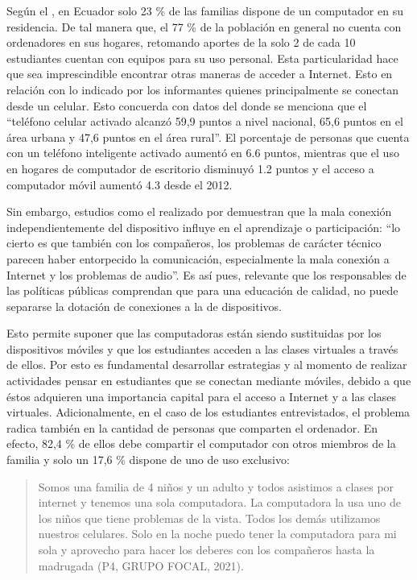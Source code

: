 \documentclass{textolivre}
\begin{document}
Según el \textcite{instituto_nacional_de_estadisticas_y_censos_de_ecuador_[inec]_encuesta_2020}, en Ecuador solo 23 \% de las familias dispone de un computador en su residencia. De tal manera que, el 77 \% de la población en general no cuenta con ordenadores en sus hogares, retomando aportes de la \textcite{organizacion_de_las_naciones_unidas_[onu]_priorizar_2021} solo 2 de cada 10 estudiantes cuentan con equipos para su uso personal. Esta particularidad hace que sea imprescindible encontrar otras maneras de acceder a Internet. 
Esto en relación con lo indicado por los informantes quienes principalmente se conectan desde un celular. Esto concuerda con datos del \textcite[p. 19]{instituto_nacional_de_estadisticas_y_censos_de_ecuador_[inec]_tecnologias_2019} donde se menciona que el “teléfono celular activado alcanzó 59,9 puntos a nivel nacional, 65,6 puntos en el área urbana y 47,6 puntos en el área rural”. El porcentaje de personas que cuenta con un teléfono inteligente activado aumentó en 6.6 puntos, mientras que el uso en hogares de computador de escritorio disminuyó 1.2 puntos y el acceso a computador móvil aumentó 4.3 desde el 2012. 

Sin embargo, estudios como el realizado por \textcite[p. 213]{roig-vila_comunicacion_2021} demuestran que la mala conexión independientemente del dispositivo influye en el aprendizaje o participación: “lo cierto es que también con los compañeros, los problemas de carácter técnico parecen haber entorpecido la comunicación, especialmente la mala conexión a Internet y los problemas de audio”. Es así pues, relevante que los responsables de las políticas públicas comprendan que para una educación de calidad, no puede separarse la dotación de conexiones a la de dispositivos. 

Esto permite suponer que las computadoras están siendo sustituidas por los dispositivos móviles y que los estudiantes acceden a las clases virtuales a través de ellos.  Por esto es fundamental desarrollar estrategias y al momento de realizar actividades pensar en estudiantes que se conectan mediante móviles, debido a que éstos adquieren una importancia capital para el acceso a Internet y a las clases virtuales. Adicionalmente, en el caso de los estudiantes entrevistados, el problema radica también en la cantidad de personas que comparten el ordenador. En efecto, 82,4 \% de ellos debe compartir el computador con otros miembros de la familia y solo un 17,6 \% dispone de uno de uso exclusivo:

\begin{quote}
    Somos una familia de 4 niños y un adulto y todos asistimos a clases por internet y tenemos una sola computadora. La computadora la usa uno de los niños que tiene problemas de la vista. Todos los demás utilizamos nuestros celulares. Solo en la noche puedo tener la computadora para mi sola y aprovecho para hacer los deberes con los compañeros hasta la madrugada (P4, GRUPO FOCAL, 2021).
\end{quote}
\end{document}
